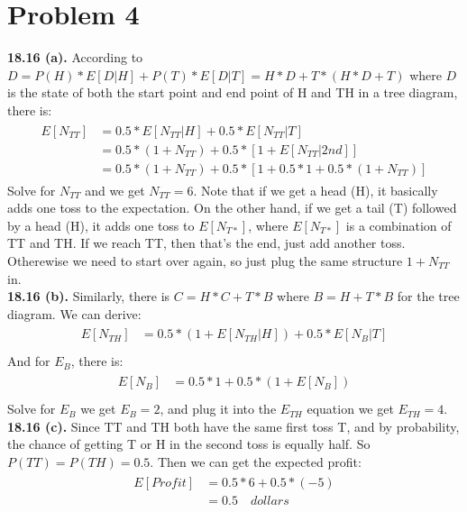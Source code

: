 \documentclass[titlepage, paper=a4, fontsize=11pt]{scrartcl} %
\numberwithin{equation}{section} %
\numberwithin{figure}{section} %
\numberwithin{table}{section} %
\begin{document}

\section*{Problem 4}
\textbf{18.16 (a).}
According to $D = P(H) * E[D | H] + P(T) * E[D | T] = H * D + T * (H * D + T)$ where $D$ is the state of both the start point and end point of H and TH in a tree diagram, there is:
\begin{align*} 
\begin{split}
E[N_{TT}] &= 0.5 * E[N_{TT} | H] + 0.5 * E[N_{TT} | T] \\
&= 0.5 * (1 + N_{TT}) + 0.5 * [1 + E[N_{TT} | 2nd]] \\
&= 0.5 * (1 + N_{TT}) + 0.5 * [1 + 0.5 * 1 + 0.5 * (1 + N_{TT})]
\end{split}					
\end{align*}
Solve for $N_{TT}$ and we get $N_{TT} = 6$.
Note that if we get a head (H), it basically adds one toss to the expectation. On the other hand, if we get a tail (T) followed by a head (H), it adds one toss to $E[N_{T*}]$, where $E[N_{T*}]$ is a combination of TT and TH. If we reach TT, then that's the end, just add another toss. Otherewise we need to start over again, so just plug the same structure $1 + N_{TT}$ in.
\\
\textbf{18.16 (b).}
Similarly, there is $C = H * C + T * B$ where $B = H + T * B$ for the tree diagram. We can derive:
\begin{align*} 
\begin{split}
E[N_{TH}] &= 0.5 * ( 1 + E[N_{TH} | H] ) + 0.5 * E[N_{B} | T] \\
\end{split}					
\end{align*}
And for $E_{B}$, there is:
\begin{align*} 
\begin{split}
E[N_{B}] &= 0.5 * 1 + 0.5 * ( 1 + E[N_{B}] ) \\
\end{split}					
\end{align*}
Solve for $E_{B}$ we get $E_{B} = 2$, and plug it into the $E_{TH}$ equation we get $E_{TH} = 4$.
\\
\textbf{18.16 (c).}
Since TT and TH both have the same first toss T, and by probability, the chance of getting T or H in the second toss is equally half. So $P(TT) = P(TH) = 0.5$. Then we can get the expected profit:
\begin{align*} 
\begin{split}
E[Profit] &= 0.5 * 6 + 0.5 * (-5) \\
&= 0.5 \quad dollars
\end{split}					
\end{align*}
\end{document}
